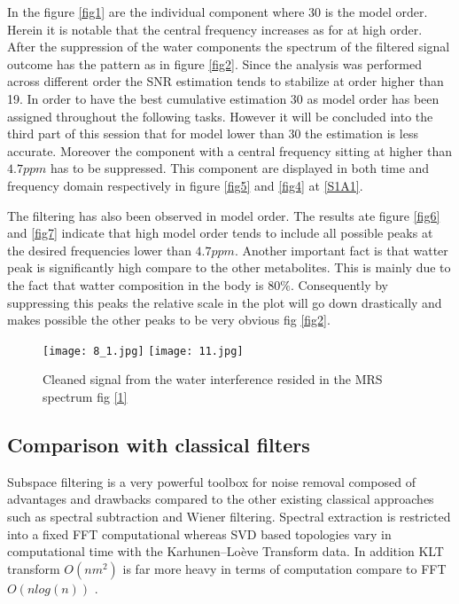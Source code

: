 In the figure \ref{fig1} are the individual component where 30 is the model order. Herein it is notable that the central frequency increases as for at high order. After the suppression of the water components the spectrum of the filtered signal outcome has the pattern as in figure \ref{fig2}. Since the analysis was performed across different order the SNR estimation tends to stabilize at order higher than 19. In order to have the best cumulative estimation 30 as model order has been assigned throughout the following tasks. However it will be concluded into the third part of this session that for model lower than 30 the estimation is less accurate. Moreover the component with a central frequency sitting at higher than $4.7 ppm$ has to be suppressed. This component are displayed in both time and frequency domain respectively in figure \ref{fig5} and \ref{fig4} at \ref{S1A1}. 

The filtering has also been observed in model order. The results ate figure \ref{fig6} and \ref{fig7} indicate that high model order tends to include all possible peaks at the desired frequencies lower than $4.7ppm$. Another important fact is that watter peak is significantly high compare to the other metabolites. This is mainly due to the fact that watter composition in the body is $80\%$. Consequently by suppressing this peaks the relative scale in the plot will go down drastically and makes possible the other peaks to be very obvious fig \ref{fig2}. 


\begin{figure}[!htbp]

%
\centering
\texttt{[image: 8\_1.jpg]}
\label{fig2}
\endminipage\hfill
{}%
\centering
\texttt{[image: 11.jpg]}
\label{Nad1}
\endminipage\hfill
\caption{Cleaned signal from the water interference resided in the MRS spectrum fig \ref{1}}
\end{figure}

\newpage
\subsection{Comparison with classical filters}

Subspace filtering is a very powerful toolbox for noise removal composed of advantages and drawbacks compared to the other existing classical approaches such as spectral subtraction and Wiener filtering. Spectral extraction is restricted into a fixed FFT computational whereas SVD based topologies vary in computational time with the  Karhunen–Loève Transform data. In addition KLT transform $O(nm^2)$ is far more heavy in terms of computation compare to FFT $O(nlog(n))$ \cite{2}.

